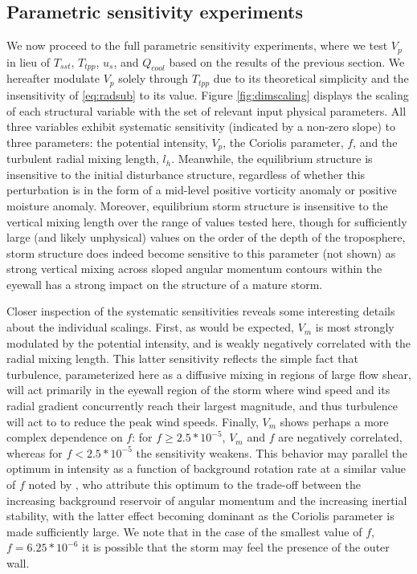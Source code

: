 \documentclass[12pt]{article}
\begin{document}
\subsection{Parametric sensitivity experiments}
We now proceed to the full parametric sensitivity experiments, where we test $V_p$ in lieu of $T_{sst}$, $T_{tpp}$, $u_s$, and $Q_{cool}$ based on the results of the previous section. We hereafter modulate $V_p$ solely through $T_{tpp}$ due to its theoretical simplicity and the insensitivity of \eqref{eq:radsub} to its value. Figure \ref{fig:dimscaling} displays the scaling of each structural variable with the set of relevant input physical parameters.  All three variables exhibit systematic sensitivity (indicated by a non-zero slope) to three parameters: the potential intensity, $V_p$, the Coriolis parameter, $f$, and the turbulent radial mixing length, $l_h$. Meanwhile, the equilibrium structure is insensitive to the initial disturbance structure, regardless of whether this perturbation is in the form of a mid-level positive vorticity anomaly or positive moisture anomaly.  Moreover, equilibrium storm structure is insensitive to the vertical mixing length over the range of values tested here, though for sufficiently large (and likely unphysical) values on the order of the depth of the troposphere, storm structure does indeed become sensitive to this parameter (not shown) as strong vertical mixing across sloped angular momentum contours within the eyewall has a strong impact on the structure of a mature storm.

Closer inspection of the systematic sensitivities reveals some interesting details about the individual scalings. First, as would be expected, $V_m$ is most strongly modulated by the potential intensity, and is weakly negatively correlated with the radial mixing length. This latter sensitivity reflects the simple fact that turbulence, parameterized here as a diffusive mixing in regions of large flow shear, will act primarily in the eyewall region of the storm where wind speed and its radial gradient concurrently reach their largest magnitude, and thus turbulence will act to to reduce the peak wind speeds. Finally, $V_m$ shows perhaps a more complex dependence on $f$: for $f \ge 2.5 * 10^{-5}$, $V_m$ and $f$ are negatively correlated, whereas for $f < 2.5 * 10^{-5}$ the sensitivity weakens.  This behavior may parallel the optimum in intensity as a function of background rotation rate at a similar value of $f$ noted by \cite{Smith_Schmidt_Montgomery_2011}, who attribute this optimum to the trade-off between the increasing background reservoir of angular momentum and the increasing inertial stability, with the latter effect becoming dominant as the Coriolis parameter is made sufficiently large.  We note that in the case of the smallest value of $f$, $f = 6.25 * 10^{-6}$ it is possible that the storm may feel the presence of the outer wall.
\end{document}
